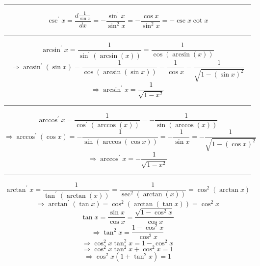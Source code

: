 \documentclass[a0paper,landscape,fleqn]{article}
\begin{document}
\hrule
\begin{equation*}
\csc^\prime x
=\frac{d\frac{1}{\sin x}}{dx}
=-\frac{\sin^\prime x}{\sin^2 x}
=-\frac{\cos x}{\sin^2 x}
=-\csc x\cot x
\end{equation*}
\hrule%
\begin{equation*}
\arcsin^\prime x
=\frac{1}{\sin^\prime(\arcsin(x))}
=\frac{1}{\cos(\arcsin(x))}
\end{equation*}
\begin{equation*}
\Rightarrow\arcsin^\prime (\sin x)
=\frac{1}{\cos(\arcsin(\sin x))}
=\frac{1}{\cos x}
=\frac{1}{\sqrt{1-(\sin x)^2}}
\end{equation*}
\begin{equation*}
\Rightarrow\arcsin^\prime x
=\frac{1}{\sqrt{1-x^2}}
\end{equation*}
\hrule%
\begin{equation*}
\arccos^\prime x
=\frac{1}{\cos^\prime(\arccos(x))}
=-\frac{1}{\sin(\arccos(x))}
\end{equation*}
\begin{equation*}
\Rightarrow\arccos^\prime (\cos x)
=-\frac{1}{\sin(\arccos(\cos x))}
=-\frac{1}{\sin x}
=-\frac{1}{\sqrt{1-(\cos x)^2}}
\end{equation*}
\begin{equation*}
\Rightarrow\arccos^\prime x
=-\frac{1}{\sqrt{1-x^2}}
\end{equation*}
\hrule%
\begin{equation*}
\arctan^\prime x
=\frac{1}{\tan^\prime(\arctan(x))}
=\frac{1}{\sec^2(\arctan(x))}
=\cos^2(\arctan x)
\end{equation*}
\begin{equation*}
\Rightarrow\arctan^\prime (\tan x)
=\cos^2(\arctan (\tan x))
=\cos^2 x
\end{equation*}
\begin{equation*}
\tan x
=\frac{\sin x}{\cos x}
=\frac{\sqrt{1-\cos^2 x}}{\cos x}
\end{equation*}
\begin{equation*}\Rightarrow\tan^2 x=\frac{1-\cos^2 x}{\cos^2 x}\end{equation*}
\begin{equation*}\Rightarrow\cos^2 x\tan^2 x=1-\cos^2 x\end{equation*}
\begin{equation*}\Rightarrow\cos^2 x\tan^2 x+\cos^2 x=1\end{equation*}
\begin{equation*}\Rightarrow\cos^2 x(1+\tan^2 x)=1\end{equation*}
\end{document}
